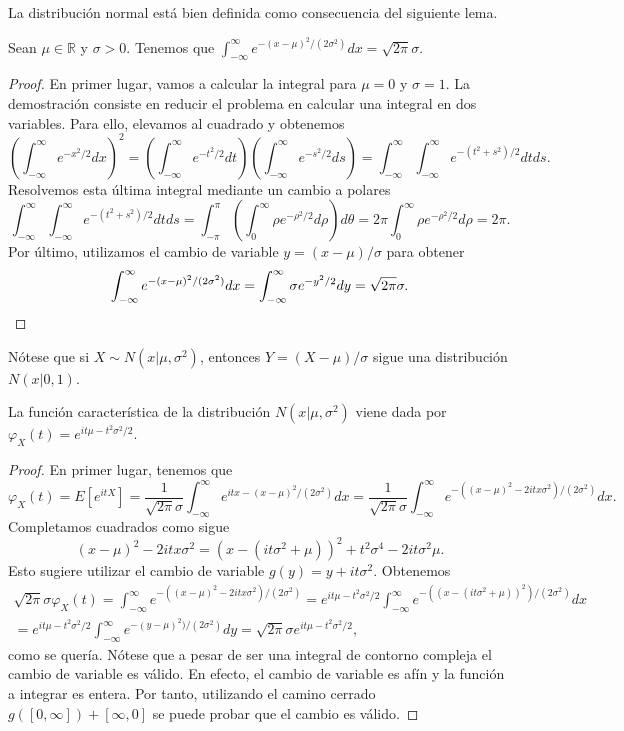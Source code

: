 La distribución normal está bien definida como consecuencia del siguiente lema.
\begin{lem}
    Sean $\mu \in \mathbb{R}$ y $\sigma > 0$. Tenemos que $\int_{-\infty}^\infty e^{-(x-\mu)^2 / (2\sigma^2)}dx = \sqrt{2\pi}\sigma.$
\end{lem}
\begin{proof}
    En primer lugar, vamos a calcular la integral para $\mu = 0$ y $\sigma = 1$. La demostración consiste en reducir el problema en calcular una integral en dos variables. Para ello, elevamos al cuadrado y obtenemos
    \[\left(\int_{-\infty}^\infty e^{-x^2 / 2}dx\right)^2 = \left(\int_{-\infty}^\infty e^{-t^2 / 2}dt\right) \left(\int_{-\infty}^\infty e^{-s^2 / 2}ds \right) = \int_{-\infty}^\infty \int_{-\infty}^\infty e^{-(t^2+s^2) / 2} dt ds. \]
    Resolvemos esta última integral mediante un cambio a polares
    \[\int_{-\infty}^\infty \int_{-\infty}^\infty e^{-(t^2+s^2) / 2} dt ds = \int_{-\pi}^\pi \left(\int_{0}^\infty \rho e^{-\rho^2 / 2} d\rho \right) d\theta = 2\pi \int_{0}^\infty \rho e^{-\rho^2 / 2} d\rho = 2\pi.\]
    Por último, utilizamos el cambio de variable $y = (x - \mu) / \sigma$ para obtener
    \[\int_{-\infty}^\infty e^{-(x-\mu)^2 / (2\sigma^2)}dx = \int_{-\infty}^\infty \sigma e^{-y^2 / 2}dy = \sqrt{2\pi}\sigma. \qedhere\]
\end{proof}

Nótese que si $X \sim N(x | \mu, \sigma^2)$, entonces $Y = (X - \mu)/\sigma$ sigue una distribución $N(x|0,1)$.

\begin{prop} \label{prop:normal:cf}
    La función característica de la distribución $N(x|\mu, \sigma^2)$ viene dada por $\varphi_X(t) = e^{it\mu - t^2 \sigma^2 / 2}$.
\end{prop}
\begin{proof}
    En primer lugar, tenemos que
    \[\varphi_X(t) = E[e^{itX}] = \frac{1}{\sqrt{2\pi}\sigma} \int_{-\infty}^{\infty} e^{itx-(x-\mu)^2 / (2\sigma^2)} dx = \frac{1}{\sqrt{2\pi}\sigma} \int_{-\infty}^{\infty} e^{-((x-\mu)^2 - 2itx\sigma^2) / (2\sigma^2)} dx.\]
    Completamos cuadrados como sigue
    \[(x-\mu)^2 - 2 itx\sigma^2 = (x - (it \sigma^2 + \mu))^2 + t^2 \sigma^4 - 2it\sigma^2 \mu.\]
    Esto sugiere utilizar el cambio de variable $g(y) = y + it \sigma^2$. Obtenemos
    \begin{align*}
        \sqrt{2\pi}\sigma \varphi_X(t) = \int_{-\infty}^{\infty} e^{-((x-\mu)^2 - 2itx\sigma^2) / (2\sigma^2)} = e^{it\mu - t^2 \sigma^2 / 2} \int_{-\infty}^{\infty} e^{-((x-(it \sigma^2 + \mu))^2 ) / (2\sigma^2)} dx \\
        = e^{it\mu - t^2 \sigma^2 / 2} \int_{-\infty}^{\infty} e^{-(y - \mu)^2 ) / (2\sigma^2)} dy = \sqrt{2\pi}\sigma e^{it\mu - t^2 \sigma^2 / 2},
    \end{align*}
    como se quería.
    Nótese que a pesar de ser una integral de contorno compleja el cambio de variable es válido. En efecto, el cambio de variable es afín y la función a integrar es entera. Por tanto, utilizando el camino cerrado $g([0, \infty]) + [\infty, 0]$ se puede probar que el cambio es válido.
\end{proof}

